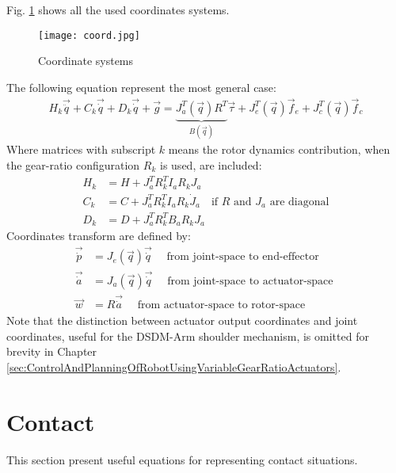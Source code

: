 Fig. \ref{fig:coord} shows all the used coordinates systems. 
%
\begin{figure}[t]
	\centering
		\texttt{[image: coord.jpg]}
	\caption{Coordinate systems}
	\label{fig:coord}
\end{figure}
%
The following equation represent the most general case:
%
\begin{align}
H_k \vec{\ddot{q}} + C_k \vec{\dot{q}} + D_k \vec{\dot{q}} + \vec{g} =  \underbrace{ J_a^T(\vec{q}) R^T }_{B(\vec{q})}  \vec{\tau} + J_e^T(\vec{q}) \vec{f}_e + J_c^T(\vec{q}) \vec{f}_c
\label{eq:manipulator}
\end{align}
%
Where matrices with subscript $k$ means the rotor dynamics contribution, when the gear-ratio configuration $R_k$ is used, are included:
%
\begin{align}
H_k   &= H + J_a^T R_k^T I_a R_k J_a        \\
C_k   &= C + J_a^T R_k^T I_a R_k \dot{J}_a \quad \text{if $R$ and $J_a$ are diagonal} \\
D_k   &= D + J_a^T R_k^T B_a R_k J_a 
\label{eq:coord_transform}
\end{align}
%
Coordinates transform are defined by:
%
\begin{align}
\vec{\dot{p}}   &= J_e( \vec{q} ) \vec{\dot{q} }  \quad \text{ from joint-space to end-effector   } \\
\vec{\dot{a}}   &= J_a( \vec{q} ) \vec{\dot{q} }  \quad \text{ from joint-space to actuator-space } \\
\vec{w }        &= R              \vec{\dot{a} }  \quad \text{ from actuator-space to rotor-space } 
\label{eq:coord_transform}
\end{align}
%
Note that the distinction between actuator output coordinates and joint coordinates, useful for the DSDM-Arm shoulder mechanism, is omitted for brevity in Chapter \ref{sec:ControlAndPlanningOfRobotUsingVariableGearRatioActuators}. 

\section{Contact}
\label{sec:contact}

This section present useful equations for representing contact situations.

